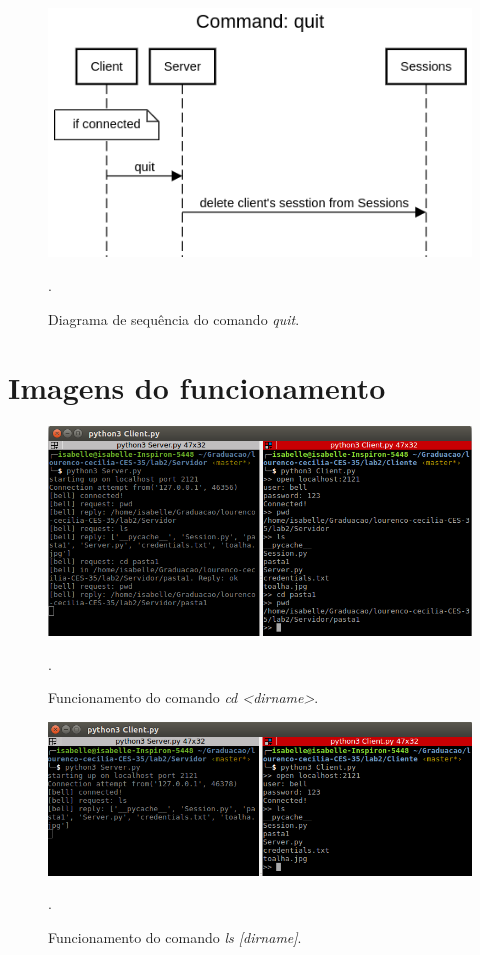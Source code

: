 \documentclass[conference]{IEEEtran}
\begin{document}
\begin{figure}[H]
\centering
\centerline{\includegraphics[scale=0.4]{diagrams/Command_quit.png}}
\caption{Diagrama de sequência do comando \textit{quit}.}.
\label{quit}
\end{figure}

\section{Imagens do funcionamento}

\begin{figure}[H]
\centering
\centerline{\includegraphics[scale=0.3]{prints/cd1.png}}
\caption{Funcionamento do comando \textit{cd <dirname>}.}.
\label{cd1}
\end{figure}

\begin{figure}[H]
\centering
\centerline{\includegraphics[scale=0.3]{prints/ls1.png}}
\caption{Funcionamento do comando \textit{ls [dirname]}.}.
\label{ls1}
\end{figure}
\end{document}
